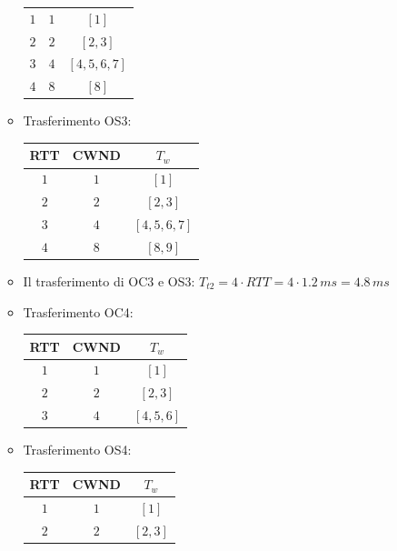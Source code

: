 \documentclass[10pt]{article}
\newcommand{\lightrule}{%
	\arrayrulecolor{black!30}%
	\midrule[\lightrulewidth]%
	\arrayrulecolor{black}}
\begin{document}
\begin{enumerate}
\begin{itemize}
\begin{center}
\begin{tabular}{@{} *{3}{c} @{}}
 				\midrule
 					$1$ & $1$ & $[1]$ \\ 
				\lightrule
 					$2$ & $2$ & $[2,3]$ \\ 
 				\lightrule
 					$3$ & $4$ & $[4,5,6,7]$ \\ 
 				\lightrule
 					$4$ & $8$ & $[8]$ \\
				\bottomrule
				\end{tabular}
			\end{center}
			\item Trasferimento OS3:
			\begin{center}
				\centering
 				\begin{tabular}{@{} *{3}{c} @{}}
 				\toprule
 					\textbf{RTT} & \textbf{CWND} & \textbf{$T_w$} \\
 				\midrule
 					$1$ & $1$ & $[1]$ \\ 
				\lightrule
 					$2$ & $2$ & $[2,3]$ \\
				\lightrule
 					$3$ & $4$ & $[4,5,6,7]$ \\ 				
 				\lightrule
 					$4$ & $8$ & $[8,9]$ \\
				\bottomrule
				\end{tabular}
			\end{center}
			\item Il trasferimento di OC3 e OS3: $T_{t2} = 4 \cdot RTT = 4 \cdot 1.2 \,ms = 4.8 \,ms$
			\item Trasferimento OC4:
			\begin{center}
				\centering
 				\begin{tabular}{@{} *{3}{c} @{}}
 				\toprule
 					\textbf{RTT} & \textbf{CWND} & \textbf{$T_w$} \\
 				\midrule
 					$1$ & $1$ & $[1]$ \\ 
				\lightrule
 					$2$ & $2$ & $[2,3]$ \\  
 				\lightrule
 					$3$ & $4$ & $[4,5,6]$ \\
				\bottomrule
				\end{tabular}
			\end{center}
			\item Trasferimento OS4:
			\begin{center}
				\centering
 				\begin{tabular}{@{} *{3}{c} @{}}
 				\toprule
 					\textbf{RTT} & \textbf{CWND} & \textbf{$T_w$} \\
 				\midrule
 					$1$ & $1$ & $[1]$ \\ 
				\lightrule
 					$2$ & $2$ & $[2,3]$ \\

\end{tabular}
\end{center}
\end{itemize}
\end{enumerate}
\end{document}
